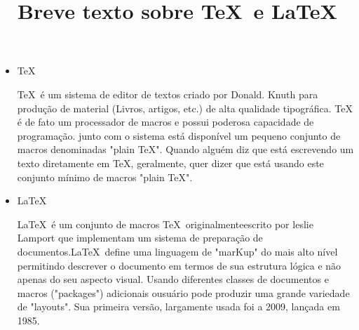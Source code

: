 \documentclass[12pt]{memoir}
\begin{document}
	
\title{Breve texto sobre \TeX\ e \LaTeX}
\maketitle

\begin{itemize}	
\item   \TeX  

 \TeX\ é um sistema de editor de textos criado por Donald. Knuth para produção de material (Livros, artigos, etc.) de alta qualidade tipográfica. \TeX{} é de fato um processador de macros e possui poderosa capacidade de programação. junto com o sistema está disponível um pequeno conjunto de macros denominadas "plain \TeX ". Quando alguém diz que está escrevendo um texto diretamente em \TeX, geralmente, quer dizer que está usando este conjunto mínimo de macros "plain \TeX ".

\item  \LaTeX 

\LaTeX\ é um conjunto de macros \TeX\  originalmenteescrito por leslie Lamport que implementam um sistema de preparação de documentos.\LaTeX\ define uma linguagem de "marKup" do mais alto nível permitindo descrever o documento em termos de sua estrutura lógica e não apenas do seu aspecto visual. Usando diferentes classes de documentos e macros ("packages") adicionais ousuário pode produzir uma grande variedade de "layouts". Sua primeira versão, largamente usada foi a 2009, lançada em 1985.


\end{itemize}	
	
	
\end{document}
